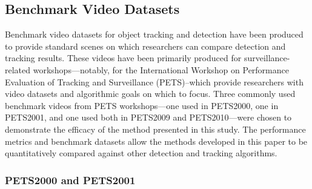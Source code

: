 \documentclass[twocolumn, final]{svjour3}
\newcommand{\willie}[1]{\textcolor{green}{\textsf{\emph{\textbf{\textcolor{green}{#1}}}}}}
\begin{document}





\subsection{Benchmark Video Datasets}

Benchmark video datasets for object tracking and detection have been produced to provide standard scenes on which researchers can compare detection and tracking results. These videos have been primarily produced for surveillance-related workshops---notably, for the International Workshop on Performance Evaluation of Tracking and Surveillance (PETS)--which provide researchers with video datasets and algorithmic goals on which to focus. Three commonly used benchmark videos from PETS workshops---one used in PETS2000, one in PETS2001, and one used both in PETS2009 and PETS2010---were chosen to demonstrate the efficacy of the method presented in this study. The performance metrics and benchmark datasets allow the methods developed in this paper to be quantitatively compared against other detection and tracking algorithms.


\subsubsection{PETS2000 and PETS2001}
\label{sec:pets2000_2001}
\end{document}
